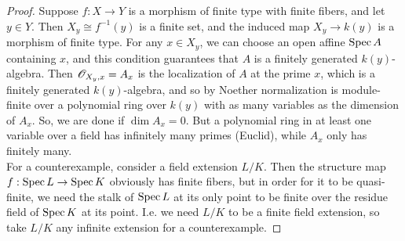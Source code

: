 \begin{proof}
	Suppose $f : X \to Y$ is a morphism of finite type with finite fibers, and let $y \in Y$. Then $X_y \cong f^{-1}(y)$ is a finite set, and the induced map $X_y \to k(y)$ is a morphism of finite type. For any $x \in X_y$, we can choose an open affine $\operatorname{Spec} A$ containing $x$, and this condition guarantees that $A$ is a finitely generated $k(y)$-algebra. Then $\mathscr{O}_{X_y,x} = A_x$ is the localization of $A$ at the prime $x$, which is a finitely generated $k(y)$-algebra, and so by Noether normalization is module-finite over a polynomial ring over $k(y)$ with as many variables as the dimension of $A_x$. So, we are done if $\dim A_x = 0$. But a polynomial ring in at least one variable over a field has infinitely many primes (Euclid), while $A_x$ only has finitely many. \\
	
	For a counterexample, consider a field extension $L/K$. Then the structure map $f : \operatorname{Spec} L \to \operatorname{Spec} K$ obviously has finite fibers, but in order for it to be quasi-finite, we need the stalk of $\operatorname{Spec} L$ at its only point to be finite over the residue field of $\operatorname{Spec} K$ at its point. I.e. we need $L/K$ to be a finite field extension, so take $L/K$ any infinite extension for a counterexample.
\end{proof}
